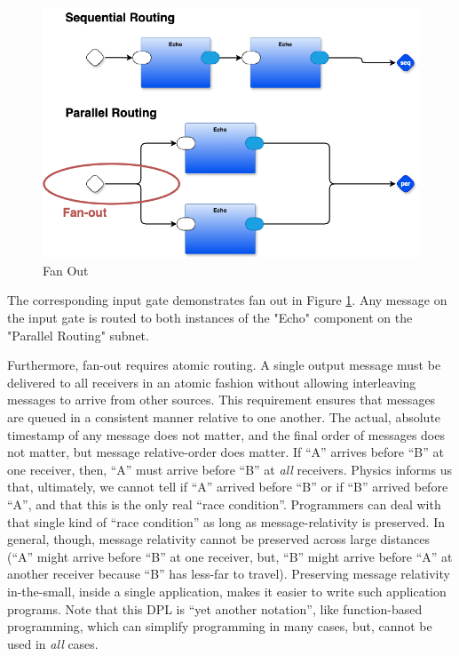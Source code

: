 \documentclass[10pt,anonymous,review]{acmart}
\begin{document}
  \begin{figure}
    \includegraphics[scale=0.1]{./media/fanout.png}
    \caption{Fan Out}
    \label{fanout}
  \end{figure}
The corresponding input gate demonstrates fan out in Figure \ref{fanout}. Any message on the input gate is routed to both instances of the "Echo" component on the "Parallel Routing" subnet.


Furthermore, fan-out requires atomic routing. A single output message must be delivered to all receivers in an atomic fashion without allowing interleaving messages to arrive from other sources. This requirement ensures that messages are queued in a consistent manner relative to one another. The actual, absolute timestamp of any message does not matter, and the final order of messages does not matter, but message relative-order does matter. If “A” arrives before “B” at one receiver, then, “A” must arrive before “B” at \emph{all} receivers. Physics informs us that, ultimately, we cannot tell if “A” arrived before “B” or if “B” arrived before “A”, and that this is the only real “race condition”. Programmers can deal with that single kind of “race condition” as long as message-relativity is preserved. In general, though, message relativity cannot be preserved across large distances (“A” might arrive before “B” at one receiver, but, “B” might arrive before “A” at another receiver because “B” has less-far to travel). Preserving message relativity in-the-small, inside a single application, makes it easier to write such application programs. Note that this DPL is “yet another notation”, like function-based programming, which can simplify programming in many cases, but, cannot be used in \emph{all} cases.
\end{document}
